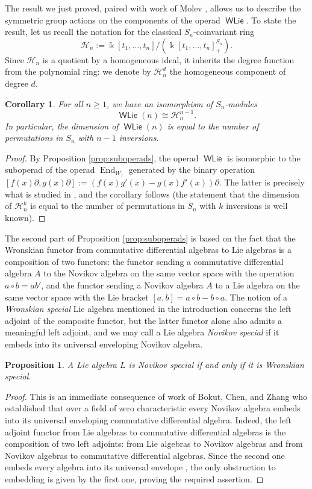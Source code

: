 \documentclass[11pt,reqno]{amsart}
\theoremstyle{plain}
\newtheorem{proposition}[theorem]{Proposition}
\newtheorem{corollary}[theorem]{Corollary}
\theoremstyle{definition}
\theoremstyle{remark}
\newcommand{\bk}{\Bbbk}
\DeclareMathOperator{\WLie}{\mathsf{WLie}}
\DeclareMathOperator{\End}{End}
\newcommand{\cH}{\mathcal H}
\begin{document}
The result we just proved, paired with work of Molev \cite{Mo}, allows us to describe the symmetric group actions on the components of the operad $\WLie$. To state the result, let us recall the notation for the classical $S_n$-coinvariant ring 
 \[
\cH_n:=\bk[t_1,\ldots,t_n]/(\bk[t_1,\ldots,t_n]_+^{S_n}).     
 \]
Since $\cH_n$ is a quotient by a homogeneous ideal, it inherits the degree function from the polynomial ring: we denote by $\cH_n^d$ the homogeneous component of degree $d$.

\begin{corollary}\label{cor:Molev-WLie}
For all $n\ge 1$, we have an isomorphism of $S_n$-modules 
 \[
\WLie(n)\cong\cH_n^{n-1}.     
 \]
In particular, the dimension of $\WLie(n)$ is equal to the number of permutations in $S_n$ with $n-1$ inversions.
\end{corollary}

\begin{proof}
By Proposition \ref{prop:suboperads}, the operad $\WLie$ is isomorphic to the suboperad of the operad $\End_{W_1}$ generated by the binary operation $[f(x)\partial,g(x)\partial]:=(f(x)g'(x)-g(x)f'(x))\partial$.     
The latter is precisely what is studied in \cite[Th.~1]{Mo}, and the corollary follows (the statement that the dimension of $\cH_n^k$ is equal to the number of permutations in $S_n$ with $k$ inversions is well known). 
\end{proof}

The second part of Proposition \ref{prop:suboperads} is based on the fact that the Wronskian functor from commutative differential algebras to Lie algebras is a composition of two functors: the functor sending a commutative differential algebra $A$ to the Novikov algebra on the same vector space with the operation $a\circ b=ab'$, and the functor sending a Novikov algebra $A$ to a Lie algebra on the same vector space with the Lie bracket $[a,b]=a\circ b-b\circ a$. The notion of a \emph{Wronskian special} Lie algebra mentioned in the introduction concerns the left adjoint of the composite functor, but the latter functor alone also admits a meaningful left adjoint, and we may call a Lie algebra \emph{Novikov special} if it embeds into its universal enveloping Novikov algebra. 

\begin{proposition}\label{prop:NovWroSpec}
A Lie algebra $L$ is Novikov special if and only if it is Wronskian special.
\end{proposition}

\begin{proof}
This is an immediate consequence of work of Bokut, Chen, and Zhang \cite{MR3590862} who established that over a field of zero characteristic every Novikov algebra embeds into its universal enveloping commutative differential algebra. Indeed, the left adjoint functor from Lie algebras to commutative differential algebras is the composition of two left adjoints: from Lie algebras to Novikov algebras and from Novikov algebras to commutative differential algebras. Since the second one embeds every algebra into its universal envelope \cite[Th.~3]{MR3590862}, the only obstruction to embedding is given by the first one, proving the required assertion.
\end{proof}
\end{document}
